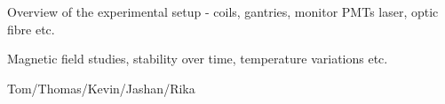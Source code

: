 
Overview of the experimental setup - coils, gantries, monitor PMTs laser, optic fibre etc.

Magnetic field studies, stability over time, temperature variations etc.

Tom/Thomas/Kevin/Jashan/Rika


